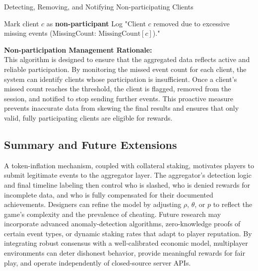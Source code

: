 \documentclass[11pt]{article}
\begin{document}
\begin{algorithm}[H]
\scriptsize
\caption{Detecting, Removing, and Notifying Non-participating Clients}
\label{algo:removeNonParticipantsNotify}
\begin{algorithmic}[1]
              \State Mark client $c$ as \textbf{non-participant}
              \State Log "Client $c$ removed due to excessive missing events (MissingCount: $\text{MissingCount}[c]$)."
              \State {}
         \EndIf
    \EndFor
\EndProcedure
\end{algorithmic}
\end{algorithm}

\noindent\textbf{Non-participation Management Rationale:}\\
This algorithm is designed to ensure that the aggregated data reflects active and reliable participation. By monitoring the missed event count for each client, the system can identify clients whose participation is insufficient. Once a client's missed count reaches the threshold, the client is flagged, removed from the session, and notified to stop sending further events. This proactive measure prevents inaccurate data from skewing the final results and ensures that only valid, fully participating clients are eligible for rewards.

\subsection{Summary and Future Extensions}
A token-inflation mechanism, coupled with collateral staking, motivates players to submit legitimate events to the aggregator layer. The aggregator’s detection logic and final timeline labeling then control who is slashed, who is denied rewards for incomplete data, and who is fully compensated for their documented achievements. Designers can refine the model by adjusting $\rho$, $\theta$, or $p$ to reflect the game’s complexity and the prevalence of cheating. Future research may incorporate advanced anomaly-detection algorithms, zero-knowledge proofs of certain event types, or dynamic staking rates that adapt to player reputation. By integrating robust consensus with a well-calibrated economic model, multiplayer environments can deter dishonest behavior, provide meaningful rewards for fair play, and operate independently of closed-source server APIs.
\end{document}
